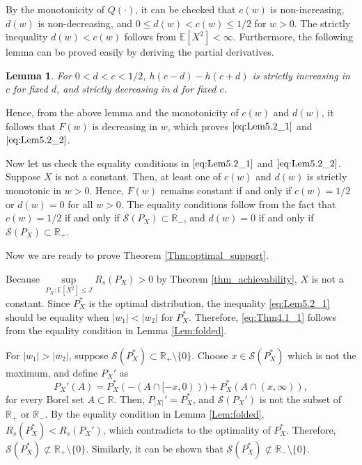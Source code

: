 \documentclass[journal]{IEEEtran}
\newtheorem{lemma}[theorem]{Lemma}
\begin{document}
\begin{IEEEproof}
By the monotonicity of $Q(\cdot)$, it can be checked that $c(w)$ is non-increasing, $d(w)$ is non-decreasing, and ${0 \leq d(w) <c(w) \leq 1/2}$ for $w>0$. The strictly inequality $d(w)<c(w)$ follows from $\mathbb{E}[X^2]<\infty$. Furthermore, the following lemma can be proved easily by deriving the partial derivatives.
\begin{lemma}
For $0<d<c<1/2$, $h(c-d)-h(c+d)$ is strictly increasing in $c$ for fixed $d$, and strictly decreasing in $d$ for fixed $c$.
\end{lemma}

Hence, from the above lemma and the  monotonicity of $c(w)$ and $d(w)$, it follows that $F(w)$ is decreasing in $w$, which proves  $\eqref{eq:Lem5.2_1}$ and $\eqref{eq:Lem5.2_2}$. 

Now let us check the equality conditions in $\eqref{eq:Lem5.2_1}$ and $\eqref{eq:Lem5.2_2}$. Suppose $X$ is not a constant. Then, at least one of $c(w)$ and $d(w)$ is strictly monotonic in $w>0$. Hence, $F(w)$ remains constant if and only if $c(w) = 1/2$ or $d(w) = 0$ for all $w>0$. The equality conditions follow from the fact that $c(w)=1/2$ if and only if $\mathcal{S}(P_X) \subset \mathbb{R_-}$, and $d(w)=0$ if and only if $\mathcal{S}(P_X) \subset \mathbb{R}_+$.
\end{IEEEproof}
Now we are ready to prove Theorem \ref{Thm:optimal_support}.
\begin{IEEEproof}
Because $\sup\limits_{P_X:\mathbb{E}[X^2]\leq J}R_s(P_X) > 0$ by Theorem \ref{thm_achievability}, $X$ is not a constant. Since $P_X^*$ is the optimal distribution, the inequality \eqref{eq:Lem5.2_1} should be equality when $|w_1|<|w_2|$ for $P_X^*$. Therefore, \eqref{eq:Thm4.1_1} follows from the equality condition in Lemma \ref{Lem:folded}.

For $|w_1|>|w_2|$, suppose $\mathcal{S}(P_X^*) \subset \mathbb{R}_+ \setminus \{0\}$. Choose $x \in \mathcal{S}(P_X^*)$ which is not the maximum, and define $P_X'$ as
\begin{equation}
    P_X'(A) = P_X^*( -(A \cap [-x,0)) ) + P_X^*(A \cap (x,\infty)),
\end{equation}
for every Borel set $A \subset \mathbb{R}$. Then, $P_{|X|}' = P_X^*$, and $\mathcal{S}(P_X')$ is not the subset of $\mathbb{R}_+$ or $\mathbb{R}_-$. By the equality condition in Lemma \ref{Lem:folded}, $R_s(P_X^*) < R_s(P_X')$, which contradicts to the optimality of $P_X^*$. Therefore, $\mathcal{S}(P_X^*) \not\subset \mathbb{R}_+ \setminus \{0\}$. Similarly, it can be shown that $\mathcal{S}(P_X^*) \not\subset \mathbb{R}_- \setminus \{0\}$.
\end{IEEEproof}
\end{document}
